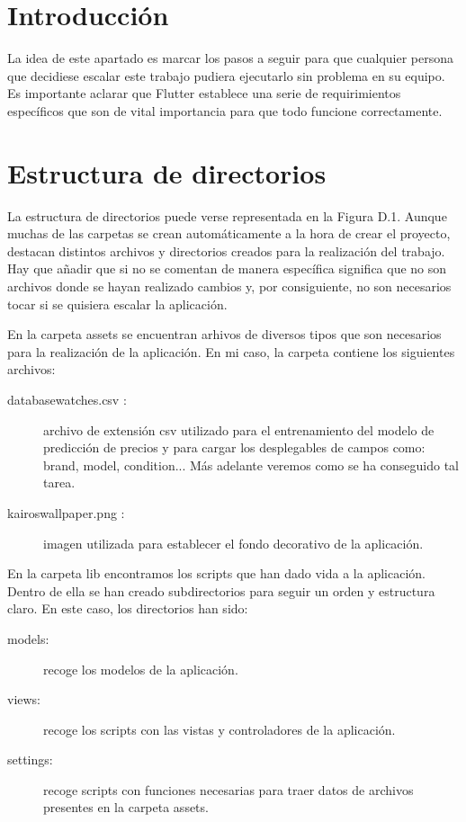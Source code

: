 
\section{Introducción}

	La idea de este apartado es marcar los pasos a seguir para que cualquier persona que decidiese escalar este trabajo pudiera ejecutarlo sin problema en su equipo. Es importante aclarar que Flutter establece una serie de requirimientos específicos que son de vital importancia para que todo funcione correctamente.

\section{Estructura de directorios}

	La estructura de directorios puede verse representada en la Figura D.1. Aunque muchas de las carpetas se crean automáticamente a la hora de crear el proyecto, destacan distintos archivos y directorios creados para la realización del trabajo. Hay que añadir que si no se comentan de manera específica significa que no son archivos donde se hayan realizado cambios y, por consiguiente, no son necesarios tocar si se quisiera escalar la aplicación.


	En la carpeta assets se encuentran arhivos de diversos tipos que son necesarios para la realización de la aplicación. En mi caso, la carpeta contiene los siguientes archivos:
	\begin{description}
		\item [databasewatches.csv :] archivo de extensión csv utilizado para el entrenamiento del modelo de predicción de precios y para cargar los desplegables de campos como: brand, model, condition... Más adelante veremos como se ha conseguido tal tarea.
		\item [kairoswallpaper.png :] imagen utilizada para establecer el fondo decorativo de la aplicación.
	\end{description}
	
	En la carpeta lib encontramos los scripts que han dado vida a la aplicación. Dentro de ella se han creado subdirectorios para seguir un orden y estructura claro. En este caso, los directorios han sido:
	\begin{description}
		\item [models:] recoge los modelos de la aplicación.
		\item [views:] recoge los scripts con las vistas y controladores de la aplicación.
		\item [settings:] recoge scripts con funciones necesarias para traer datos de archivos presentes en la carpeta assets.
	\end{description}
	
